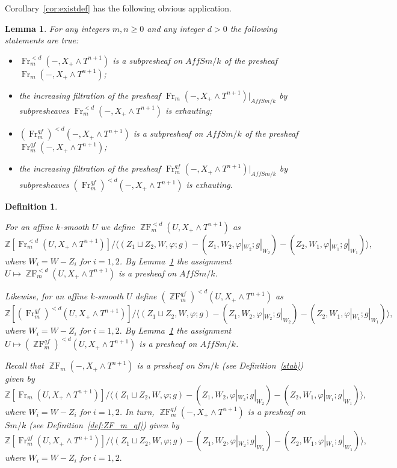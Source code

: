 \documentclass[a4paper,11pt,reqno]{amsart}
\newtheorem{lemma}[theorem]{Lemma}
\newtheorem{definition}[theorem]{Definition}
\begin{document}
Corollary~\ref{cor:existdef} has the following obvious application.

\begin{lemma}\label{l:exhauting_1}
For any integers $m,n{\geqslant} 0$ and any integer $d>0$ the following
statements are true:
\begin{itemize}
\item[(i)]
${\operatorname{Fr}}_m^{<d}(-,X_+\wedge T^{n+1})$ is a subpresheaf on $AffSm/k$ of
the presheaf ${\operatorname{Fr}}_m(-,X_+\wedge T^{n+1})$;
\item[(ii)]
the increasing filtration of the presheaf ${\operatorname{Fr}}_m(-,X_+\wedge
T^{n+1})|_{AffSm/k}$ by subpresheaves ${\operatorname{Fr}}^{<d}_m(-,X_+\wedge
T^{n+1})$ is exhauting;
\item[(iii)]
$({\operatorname{Fr}}^{qf}_m)^{<d}(-,X_+\wedge T^{n+1})$ is a subpresheaf on
$AffSm/k$ of the presheaf ${\operatorname{Fr}}^{qf}_m(-,X_+\wedge T^{n+1})$;
\item[(iv)]
the increasing filtration of the presheaf ${\operatorname{Fr}}^{qf}_m(-,X_+\wedge
T^{n+1})|_{AffSm/k}$ by subpresheaves $({\operatorname{Fr}}^{qf}_m)^{<d}(-,X_+\wedge
T^{n+1})$ is exhauting.
\end{itemize}
\end{lemma}

\begin{definition}\label{d:filtration_on_ZF_qf_m}{\rm
For an affine $k$-smooth $U$ we define ${\operatorname{\mathbb{Z}F}}_m^{<d}(U,X_+\wedge T^{n+1})$ as
$$\mathbb Z[{\operatorname{Fr}}_m^{<d}(U,X_+\wedge T^{n+1})]/
\langle(Z_1\sqcup Z_2,W,{\varphi};g)-(Z_1,W_2,{\varphi}|_{W_2};g|_{W_2})
-(Z_2,W_1,{\varphi}|_{W_1};g|_{W_1})\rangle,$$ where $W_i=W-Z_i$ for
$i=1,2$. By Lemma~\ref{l:exhauting_1} the assignment $U\mapsto
{\operatorname{\mathbb{Z}F}}_m^{<d}(U,X_+\wedge T^{n+1})$ is a presheaf on $AffSm/k$.

Likewise, for an affine $k$-smooth $U$ define
$({\operatorname{\mathbb{Z}F}}^{qf}_m)^{<d}(U,X_+\wedge T^{n+1})$ as
$$\mathbb Z[({\operatorname{Fr}}^{qf}_m)^{<d}(U,X_+\wedge T^{n+1})]/
\langle(Z_1\sqcup
Z_2,W,{\varphi};g)-(Z_1,W_2,{\varphi}|_{W_2};g|_{W_2})-(Z_2,W_1,{\varphi}|_{W_1};g|_{W_1})\rangle,$$
where $W_i=W-Z_i$ for $i=1,2.$ By Lemma~\ref{l:exhauting_1} the
assignment $U\mapsto ({\operatorname{\mathbb{Z}F}}^{qf}_m)^{<d}(U,X_+\wedge T^{n+1})$ is a
presheaf on $AffSm/k$.

Recall that ${\operatorname{\mathbb{Z}F}}_m(-,X_+\wedge T^{n+1})$ is a presheaf on $Sm/k$
(see Definition~\ref{stab}) given by
   $$\mathbb Z[{\operatorname{Fr}}_m(U,X_+\wedge T^{n+1})]/\langle(Z_1\sqcup Z_2,W,{\varphi};g)-(Z_1,W_2,{\varphi}|_{W_2};g|_{W_2})-(Z_2,W_1,{\varphi}|_{W_1};g|_{W_1})\rangle,$$
where $W_i=W-Z_i$ for $i=1,2$. In turn, ${\operatorname{\mathbb{Z}F}}^{qf}_m(-,X_+\wedge
T^{n+1})$ is a presheaf on $Sm/k$ (see Definition~\ref{def:ZF_m_qf})
given by
   $$\mathbb Z[{\operatorname{Fr}}^{qf}_m(U,X_+\wedge T^{n+1})]/\langle(Z_1\sqcup Z_2,W,{\varphi};g)-(Z_1,W_2,{\varphi}|_{W_2};g|_{W_2})-(Z_2,W_1,{\varphi}|_{W_1};g|_{W_1})\rangle,$$
where $W_i=W-Z_i$ for $i=1,2.$

}\end{definition}
\end{document}
